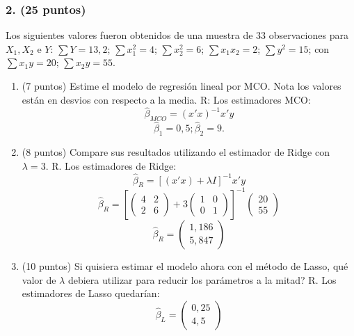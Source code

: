 \documentclass[twocolumn, 11pt, letterpaper]{article}
\begin{document}
\subsubsection*{2. (25 puntos)} Los siguientes valores fueron obtenidos de una muestra de 33 observaciones para $X_1, X_2$ e $Y$:
$\sum Y = 13,2$; $\sum x_1^2 = 4$; $\sum x_2^2 = 6$; $\sum x_1 x_2 = 2$; $\sum y^2 = 15$; con $\sum x_1 y = 20$; $\sum x_2 y = 55$.
\begin{enumerate}[label=\alph*)]
    \item (7 puntos) Estime el modelo de regresión lineal por MCO. Nota los valores están en desvios con respecto a la media.
    R: Los estimadores MCO:
    $$ \hat{\beta}_{MCO} = (x'x)^{-1}x'y $$
    $$ \hat{\beta}_1 = 0,5; \hat{\beta}_2 = 9. $$
    \item (8 puntos) Compare sus resultados utilizando el estimador de Ridge con $\lambda = 3$.
    R. Los estimadores de Ridge:
    $$ \hat{\beta}_R = [(x'x) + \lambda I]^{-1}x'y $$
    $$ \hat{\beta}_R = \left[ \begin{pmatrix} 4 & 2 \\ 2 & 6 \end{pmatrix} + 3 \begin{pmatrix} 1 & 0 \\ 0 & 1 \end{pmatrix} \right]^{-1} \begin{pmatrix} 20 \\ 55 \end{pmatrix} $$
    $$ \hat{\beta}_R = \begin{pmatrix} 1,186 \\ 5,847 \end{pmatrix} $$
    \item (10 puntos) Si quisiera estimar el modelo ahora con el método de Lasso, qué valor de $\lambda$ debiera utilizar para reducir los parámetros a la mitad?
    R. Los estimadores de Lasso quedarían:
    $$ \hat{\beta}_L = \begin{pmatrix} 0,25 \\ 4,5 \end{pmatrix} $$
\end{enumerate}
\end{document}
